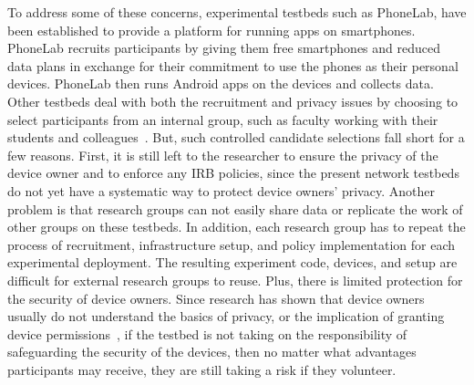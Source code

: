 To address some of these concerns, experimental testbeds such as
PhoneLab, have
been established to provide a platform for running apps on
smartphones. PhoneLab recruits participants by giving them free
smartphones and reduced data plans in exchange for their commitment to
use the phones as their personal devices. PhoneLab then runs Android
apps on the devices and collects data. Other testbeds deal with both
the recruitment and privacy issues by choosing to select participants
from an internal group, such as faculty working with their students
and colleagues~\cite{hao2013isleep, wang2012no, wang2013sensing}. But,
such controlled candidate selections fall short for a few reasons.
First, it is still left to the researcher to ensure the privacy of the
device owner and to enforce any IRB policies, since the present
network testbeds do not yet have a systematic way to protect device
owners' privacy. Another problem is that research groups can not
easily share data or replicate the work of other groups on these
testbeds. In addition, each research group has to repeat the process
of recruitment, infrastructure setup, and policy implementation for
each experimental deployment. The resulting experiment code, devices,
and setup are difficult for external research groups to reuse. Plus,
there is limited protection for the security of device owners. Since
research has shown that device owners usually do not understand the
basics of privacy, or the implication of granting device
permissions~\cite{camp2015respecting}, if the testbed is not taking on
the responsibility of safeguarding the security of the devices, then
no matter what advantages participants may receive, they are still
taking a risk if they volunteer.

